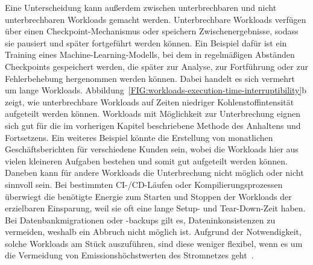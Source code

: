 Eine Unterscheidung kann außerdem zwischen unterbrechbaren und nicht unterbrechbaren Workloads gemacht werden.
Unterbrechbare Workloads verfügen über einen Checkpoint-Mechanismus oder speichern Zwischenergebnisse, sodass sie pausiert und später fortgeführt werden können.
Ein Beispiel dafür ist ein Training eines Machine-Learning-Modells, bei dem in regelmäßigen Abständen Checkpoints gespeichert werden, die später zur Analyse, zur Fortführung oder zur Fehlerbehebung hergenommen werden können.
Dabei handelt es sich vermehrt um lange Workloads.
Abbildung~\ref{FIG:workloads-execution-time-interruptibility}b zeigt, wie unterbrechbare Workloads auf Zeiten niedriger Kohlenstoffintensität aufgeteilt werden können.
Workloads mit Möglichkeit zur Unterbrechung eignen sich gut für die im vorherigen Kapitel beschriebene Methode des Anhaltens und Fortsetzens.
Ein weiteres Beispiel könnte die Erstellung von monatlichen Geschäftsberichten für verschiedene Kunden sein, wobei die Workloads hier aus vielen kleineren Aufgaben bestehen und somit gut aufgeteilt werden können.
Daneben kann für andere Workloads die Unterbrechung nicht möglich oder nicht sinnvoll sein.
Bei bestimmten CI-/CD-Läufen oder Kompilierungsprozessen überwiegt die benötigte Energie zum Starten und Stoppen der Workloads der erzielbaren Einsparung, weil sie oft eine lange Setup- und Tear-Down-Zeit haben.
Bei Datenbankmigrationen oder -backups gilt es, Dateninkonsistenzen zu vermeiden, weshalb ein Abbruch nicht möglich ist.
Aufgrund der Notwendigkeit, solche Workloads am Stück auszuführen, sind diese weniger flexibel, wenn es um die Vermeidung von Emissionshöchstwerten des Stromnetzes geht~\cite{Wiesner.2021}.

